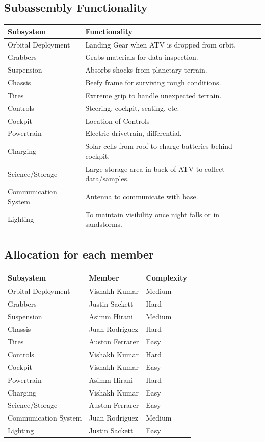 \subsection{Subassembly Functionality}
\begin{center}
\begin{tabular}{lll}
\hline
Subsystem & Functionality\\
\hline
Orbital Deployment & Landing Gear when ATV is dropped from orbit. \\
Grabbers & Grabs materials for data inspection.\\
Suspension & Absorbs shocks from planetary terrain. \\
Chassis & Beefy frame for surviving rough conditions.\\
Tires & Extreme grip to handle unexpected terrain. \\
Controls & Steering, cockpit, seating, etc.\\
Cockpit & Location of Controls\\
Powertrain & Electric drivetrain, differential. \\
Charging & Solar cells from roof to charge batteries behind cockpit. \\
Science/Storage & Large storage area in back of ATV to collect data/samples. \\
Communication System & Antenna to communicate with base. \\
Lighting & To maintain visibility once night falls or in sandstorms.\\
\hline
\end{tabular}
\end{center}

\subsection{Allocation for each member}

\begin{center}
\begin{tabular}{lll}
\hline
Subsystem & Member& Complexity\\
\hline
Orbital Deployment & Vishakh Kumar& Medium\\
Grabbers & Justin Sackett & Hard\\
Suspension & Asimm Hirani & Medium\\
Chassis & Juan Rodriguez & Hard\\
Tires & Auston Ferrarer& Easy\\
Controls & Vishakh Kumar & Hard\\
Cockpit & Vishakh Kumar & Easy\\
Powertrain & Asimm Hirani & Hard\\
Charging & Vishakh Kumar & Easy \\
Science/Storage & Auston Ferrarer & Easy\\
Communication System & Juan Rodriguez & Medium\\
Lighting & Justin Sackett& Easy\\
\hline
\end{tabular}
\end{center}

